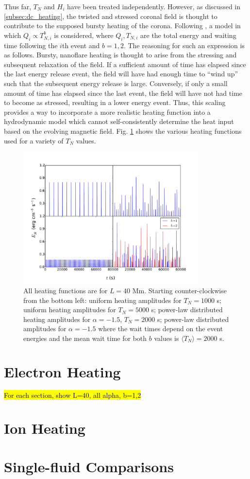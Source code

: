 %
\par Thus far, $T_N$ and $H_i$ have been treated independently. However, as discussed in \ref{subsec:dc_heating}, the twisted and stressed coronal field is thought to contribute to the supposed bursty heating of the corona. Following \citet{cargill_active_2014}, a model in which $Q_i\propto T_{N,i}^b$ is considered, where $Q_i,T_{N,i}$ are the total energy and waiting time following the $i$th event and $b=1,2$. The reasoning for such an expression is as follows. Bursty, nanoflare heating is thought to arise from the stressing and subsequent relaxation of the field. If a sufficient amount of time has elapsed since the last energy release event, the field will have had enough time to ``wind up'' such that the subsequent energy release is large. Conversely, if only a small amount of time has elapsed since the last event, the field will have not had time to become as stressed, resulting in a lower energy event. Thus, this scaling provides a way to incorporate a more realistic heating function into a hydrodynamic model which cannot self-consistently determine the heat input based on the evolving magnetic field. Fig. \ref{fig:heating_funcs} shows the various heating functions used for a variety of $T_N$ values.
%
\begin{figure}
	\centering
	\includegraphics[width=0.85\textwidth]{figures/heating_functions.pdf}
	\caption{All heating functions are for $L=40$ Mm. Starting counter-clockwise from the bottom left: uniform heating amplitudes for $T_N=1000$ s; uniform heating amplitudes for $T_N=5000$ s; power-law distributed heating amplitudes for $\alpha=-1.5$, $T_N=2000$ s; power-law distributed amplitudes for $\alpha=-1.5$ where the wait times depend on the event energies and the mean wait time for both $b$ values is $\langle T_N\rangle=2000$ s.}
	\label{fig:heating_funcs}
\end{figure}
%
\section{Electron Heating}
\label{sec:electron_heating}
%
\hl{For each section, show L=40, all alpha, b=1,2}
\section{Ion Heating}
\label{sec:ion_heating}
%
\section{Single-fluid Comparisons}
\label{sec:single_fluid}